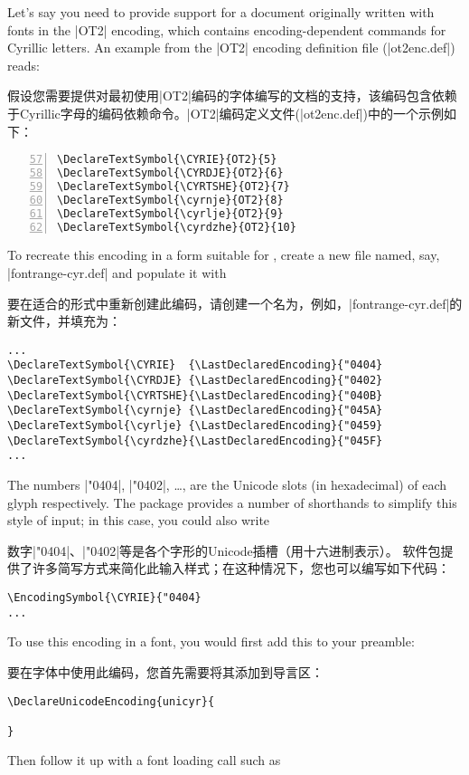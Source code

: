 \documentclass[a4paper]{l3doc}
\begin{document}
Let's say you need to provide support for a document originally written with fonts
in the |OT2| encoding, which contains encoding-dependent commands for Cyrillic letters.
An example from the |OT2| encoding definition file (|ot2enc.def|) reads:

假设您需要提供对最初使用|OT2|编码的字体编写的文档的支持，该编码包含依赖于Cyrillic字母的编码依赖命令。|OT2|编码定义文件(|ot2enc.def|)中的一个示例如下：
\begin{Verbatim}[numbers=left,firstnumber=57]
\DeclareTextSymbol{\CYRIE}{OT2}{5}
\DeclareTextSymbol{\CYRDJE}{OT2}{6}
\DeclareTextSymbol{\CYRTSHE}{OT2}{7}
\DeclareTextSymbol{\cyrnje}{OT2}{8}
\DeclareTextSymbol{\cyrlje}{OT2}{9}
\DeclareTextSymbol{\cyrdzhe}{OT2}{10}
\end{Verbatim}

To recreate this encoding in a form suitable for , create a new file
named, say, |fontrange-cyr.def| and populate it with

要在适合的形式中重新创建此编码，请创建一个名为，例如，|fontrange-cyr.def|的新文件，并填充为：

\begin{Verbatim}
...
\DeclareTextSymbol{\CYRIE}  {\LastDeclaredEncoding}{"0404}
\DeclareTextSymbol{\CYRDJE} {\LastDeclaredEncoding}{"0402}
\DeclareTextSymbol{\CYRTSHE}{\LastDeclaredEncoding}{"040B}
\DeclareTextSymbol{\cyrnje} {\LastDeclaredEncoding}{"045A}
\DeclareTextSymbol{\cyrlje} {\LastDeclaredEncoding}{"0459}
\DeclareTextSymbol{\cyrdzhe}{\LastDeclaredEncoding}{"045F}
...
\end{Verbatim}
The numbers |"0404|, |"0402|, \dots, are the Unicode slots (in hexadecimal)
of each glyph respectively.
The  package provides a number of shorthands to simplify this style of input; in this case,
you could also write

数字|"0404|、|"0402|等是各个字形的Unicode插槽（用十六进制表示）。 软件包提供了许多简写方式来简化此输入样式；在这种情况下，您也可以编写如下代码：

\begin{Verbatim}
\EncodingSymbol{\CYRIE}{"0404}
...
\end{Verbatim}

To use this encoding in a  font, you would first add this to your preamble:

要在字体中使用此编码，您首先需要将其添加到导言区：

\begin{Verbatim}
\DeclareUnicodeEncoding{unicyr}{
  
}
\end{Verbatim}
Then follow it up with a font loading call such as
\end{document}

